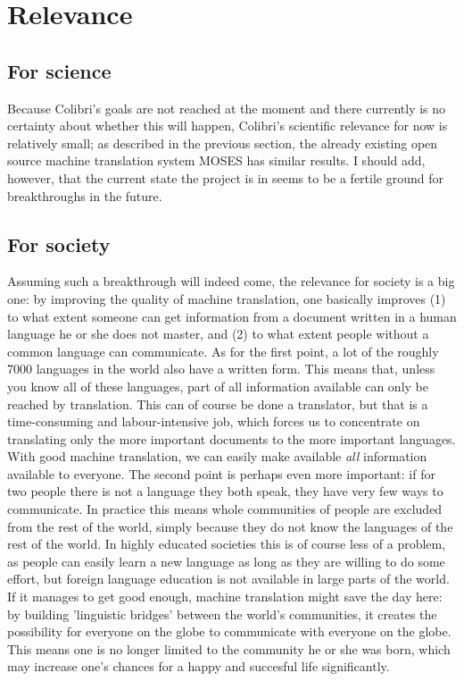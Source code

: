 \documentclass[12pt]{article}
\begin{document}
\section{Relevance}

\subsection{For science}

Because Colibri's goals are not reached at the moment and there currently is no certainty about whether this will happen, Colibri's scientific relevance for now is relatively small; as described in the previous section, the already existing open source machine translation system MOSES has similar results. I should add, however, that the current state the project is in seems to be a fertile ground for breakthroughs in the future. 

\subsection{For society} \label{soc}

Assuming such a breakthrough will indeed come, the relevance for society is a big one: by improving the quality of machine translation, one basically improves (1) to what extent someone can get information from a document written in a human language he or she does not master, and (2) to what extent people without a common language can communicate. As for the first point, a lot of the roughly 7000 languages in the world also have a written form. This means that, unless you know all of these languages, part of all information available can only be reached by translation. This can of course be done a translator, but that is a time-consuming and labour-intensive job, which forces us to concentrate on translating only the more important documents to the more important languages. With good machine translation, we can easily make available \emph{all} information available to everyone. The second point is perhaps even more important: if for two people there is not a language they both speak, they have very few ways to communicate. In practice this means whole communities of people are excluded from the rest of the world, simply because they do not know the languages of the rest of the world. In highly educated societies this is of course less of a problem, as people can easily learn a new language as long as they are willing to do some effort, but foreign language education is not available in large parts of the world. If it manages to get good enough, machine translation might save the day here: by building 'linguistic bridges' between the world's communities, it creates the possibility for everyone on the globe to communicate with everyone on the globe. This means one is no longer limited to the community he or she was born, which may increase one's chances for a happy and succesful life significantly.
\end{document}
